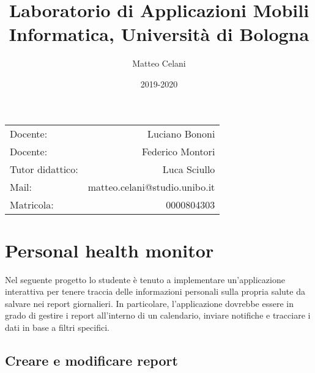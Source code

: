 \documentclass{article}
\title{Laboratorio di Applicazioni Mobili\\Informatica, Università di Bologna} %
\author{Matteo Celani} %
\date{2019-2020} %
\begin{document}
\maketitle %

\begin{center}
\begin{tabular}{l r}
Docente: 					& Luciano Bononi \\ 
Docente: 					& Federico Montori  \\ 
\medskip
Tutor didattico: 		& Luca Sciullo \\ 
Mail: 							& matteo.celani@studio.unibo.it \\
Matricola: 					& 0000804303 \\
\end{tabular}
\end{center}

\newpage
\tableofcontents

\newpage
\section{Personal health monitor}

Nel seguente progetto lo studente è tenuto a implementare un'applicazione interattiva per tenere traccia delle informazioni personali sulla propria salute da salvare nei report giornalieri. In particolare, l'applicazione dovrebbe essere in grado di gestire i report all'interno di un calendario, inviare notifiche e tracciare i dati in base a filtri specifici.

\subsection{Creare e modificare report}
\end{document}
